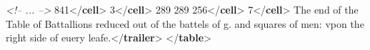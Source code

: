 \begin{shaded}
\textit{<!-- ... -->}\mbox{}\newline 
{}\mbox{}\newline 
\hspace*{1em}841{</\textbf{cell}>}\mbox{}\newline 
\hspace*{1em}3{</\textbf{cell}>}\mbox{}\newline 
\hspace*{1em}289 289 256{</\textbf{cell}>}\mbox{}\newline 
\hspace*{1em}7{</\textbf{cell}>}\mbox{}\newline 
{}\mbox{}\newline 
{}The end of the Table of Battallions reduced out of the\mbox{}\newline 
\hspace*{1em}\hspace*{1em} battels of g. and squares of men: vpon the right side of euery\mbox{}\newline 
\hspace*{1em}\hspace*{1em} leafe.{</\textbf{trailer}>}\mbox{}\newline 
{</\textbf{table}>}\end{shaded}\egroup\par 
